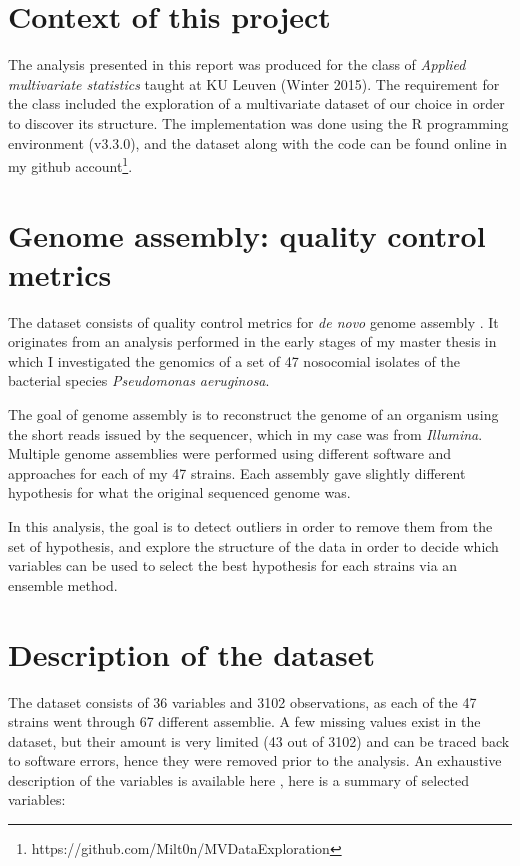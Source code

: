 \documentclass[11pt, a4paper,titlepage]{article}
\begin{document}


\section{Context of this project}

The analysis presented in this report was produced for the class of
\emph{Applied multivariate statistics} taught at KU Leuven (Winter
2015). The requirement for the class included the exploration of a
multivariate dataset of our choice in order to discover its
structure. The implementation was done using the R programming
environment (v3.3.0), and the dataset along with the code can be found
online in my github
account\footnote{https://github.com/Milt0n/MVDataExploration}.

\section{Genome assembly: quality control metrics}

The dataset consists of quality control metrics for \emph{de novo}
genome assembly \cite{baker2012novo}. It originates from an analysis
performed in the early stages of my master thesis in which I
investigated the genomics of a set of 47 nosocomial isolates of the
bacterial species \emph{Pseudomonas aeruginosa}.

The goal of genome assembly is to reconstruct the genome of an
organism using the short reads issued by the sequencer, which in my
case was from \emph{Illumina}. Multiple genome assemblies were
performed using different software and approaches for each of my 47
strains. Each assembly gave slightly different hypothesis for what the
original sequenced genome was.

In this analysis, the goal is to detect outliers in order to remove
them from the set of hypothesis, and explore the structure of the data
in order to decide which variables can be used to select the best
hypothesis for each strains via an ensemble method.

\section{Description of the dataset}

The dataset consists of 36 variables and 3102 observations, as each of
the 47 strains went through 67 different assemblie. A few missing
values exist in the dataset, but their amount is very limited (43 out
of 3102) and can be traced back to software errors, hence they were
removed prior to the analysis. An exhaustive description of the
variables is available here \cite{gurevich2013quast}, here is a
summary of selected variables:
\end{document}
